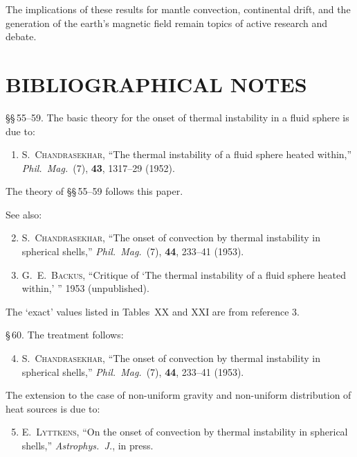 The implications of these results for mantle convection, continental
drift, and the generation of the earth's magnetic field remain topics of
active research and debate.

\section*{BIBLIOGRAPHICAL NOTES}

\noindent\S\S\,55--59. The basic theory for the onset of thermal instability in a
fluid sphere is due to:
\begin{enumerate}
\item S.\ \textsc{Chandrasekhar}, ``The thermal instability of a fluid sphere heated
within,'' \emph{Phil.\ Mag.}\ (7), \textbf{43}, 1317--29 (1952).
\end{enumerate}

\noindent The theory of \S\S\,55--59 follows this paper.

\noindent See also:
\begin{enumerate}\setcounter{enumi}{1}
\item S.\ \textsc{Chandrasekhar}, ``The onset of convection by thermal instability in
spherical shells,'' \emph{Phil.\ Mag.}\ (7), \textbf{44}, 233--41 (1953).
\item G.\ E.\ \textsc{Backus}, ``Critique of `The thermal instability of a fluid sphere
heated within,' '' 1953 (unpublished).
\end{enumerate}

\noindent The `exact' values listed in Tables~XX and XXI are from reference 3.

\noindent\S\,60. The treatment follows:
\begin{enumerate}\setcounter{enumi}{3}
\item S.\ \textsc{Chandrasekhar}, ``The onset of convection by thermal instability in
spherical shells,'' \emph{Phil.\ Mag.}\ (7), \textbf{44}, 233--41 (1953).
\end{enumerate}

\noindent The extension to the case of non-uniform gravity and non-uniform
distribution of heat sources is due to:
\begin{enumerate}\setcounter{enumi}{4}
\item E.\ \textsc{Lyttkens}, ``On the onset of convection by thermal instability in
spherical shells,'' \emph{Astrophys.\ J.}, in press.
\end{enumerate}

